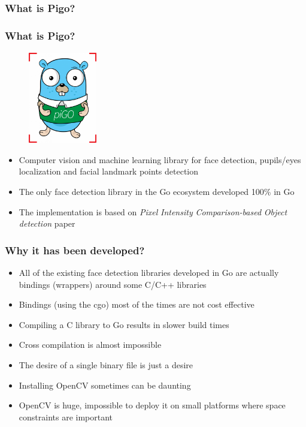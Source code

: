 \documentclass[9pt]{beamer}
\begin{document}
\begin{frame}[fragile]
\frametitle{What is Pigo?}


\end{frame}

\begin{frame}[fragile]
\frametitle{What is Pigo?}


\begin{figure}[h]
\begin{center}
\includegraphics[width=3cm,height=4cm]{assets/pigo_logo.png}
\end{center}

\end{figure}

\begin{itemize}
\item Computer vision and machine learning library for face detection, pupils/eyes localization and facial landmark points detection
\item The only face detection library in the Go ecosystem developed 100\% in Go
\item The implementation is based on \emph{Pixel} \emph{Intensity} \emph{Comparison-based} \emph{Object} \emph{detection} paper
\end{itemize}


\end{frame}

\begin{frame}[fragile]
\frametitle{Why it has been developed?}


\begin{itemize}
\item All of the existing face detection libraries developed in Go are actually bindings (wrappers) around some C/C++ libraries
\item Bindings (using the cgo) most of the times are not cost effective
\item Compiling a C library to Go results in slower build times
\item Cross compilation is almost impossible
\item The desire of a single binary file is just a desire
\item Installing OpenCV sometimes can be daunting
\item OpenCV is huge, impossible to deploy it on small platforms where space constraints are important
\end{itemize}


\end{frame}
\end{document}
